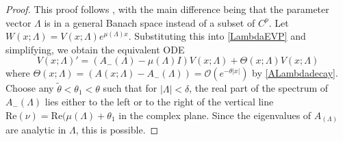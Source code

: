 \documentclass[thesis.tex]{subfiles}
\begin{document}
\begin{lemma}
\begin{proof}
This proof follows \cite{Zumbrun2009}, with the main difference being that the parameter vector $\Lambda$ is in a general Banach space instead of a subset of $C^p$. Let $W(x; \Lambda) = V(x; \Lambda) e^{\mu(\Lambda) x}$. Substituting this into \eqref{LambdaEVP} and simplifying, we obtain the equivalent ODE
\begin{equation}\label{VEVP}
V(x; \Lambda)' = (A_-(\Lambda) - \mu(\Lambda)I)V(x; \Lambda) + \Theta(x; \Lambda) V(x; \Lambda)
\end{equation}
where $\Theta(x; \Lambda) = (A(x; \Lambda) - A_-(\Lambda)) = \mathcal{O}(e^{-\theta|x|})$ by \eqref{ALambdadecay}. Choose any $\tilde{\theta} < \theta_1 < \theta$ such that for $|\Lambda| < \delta$, the real part of the spectrum of $A_-(\Lambda)$ lies either to the left or to the right of the vertical line $\text{Re}(\nu) = \text{Re}(\mu(\Lambda) + \theta_1$ in the complex plane. Since the eigenvalues of $A_(\Lambda)$ are analytic in $\Lambda$, this is possible.


\end{proof}
\end{lemma}
\end{document}
